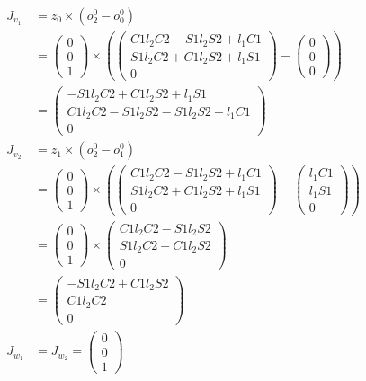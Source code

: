 \begin{align*}
J_{v_1} &= 
z_0\times (o_2^0-o_0^0)\\
 &=
\begin{pmatrix}
0 \\ 0 \\ 1
\end{pmatrix}\times\left(
\begin{pmatrix}
C1l_2C2-S1l_2S2+l_1C1 \\ S1l_2C2+C1l_2S2+l_1S1 \\ 0
\end{pmatrix}-
\begin{pmatrix}
0 \\ 0 \\ 0
\end{pmatrix}
\right) \\
 &= \begin{pmatrix}
 -S1l_2C2+C1l_2S2+l_1S1 \\ C1l_2C2-S1l_2S2-S1l_2S2-l_1C1 \\ 0
 \end{pmatrix} \\
 J_{v_2} &= 
z_1\times (o_2^0-o_1^0)\\
 &=
\begin{pmatrix}
0 \\ 0 \\ 1
\end{pmatrix}\times\left(
\begin{pmatrix}
C1l_2C2-S1l_2S2+l_1C1 \\ S1l_2C2+C1l_2S2+l_1S1 \\ 0
\end{pmatrix}-
\begin{pmatrix}
l_1C1 \\ l_1S1 \\ 0
\end{pmatrix}
\right) \\
 &= \begin{pmatrix}
0 \\ 0 \\ 1
\end{pmatrix}\times
\begin{pmatrix}
 C1l_2C2-S1l_2S2 \\ S1l_2C2+C1l_2S2 \\ 0
 \end{pmatrix} \\
 &= \begin{pmatrix}
 -S1l_2C2+C1l_2S2 \\ C1l_2C2 \\ 0
 \end{pmatrix} \\
 J_{w_1} &= J_{w_2} =  
\begin{pmatrix}
0 \\ 0 \\ 1
\end{pmatrix}
\end{align*}

